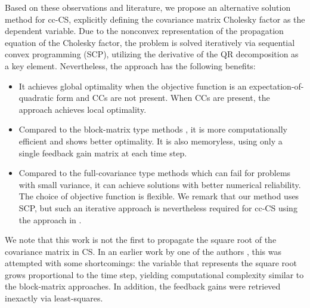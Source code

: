 Based on these observations and literature, we propose an alternative solution method for cc-CS, explicitly defining the covariance matrix Cholesky factor as the dependent variable. Due to the nonconvex representation of the propagation equation of the Cholesky factor, the problem is solved iteratively via sequential convex programming (SCP), utilizing the derivative of the QR decomposition as a key element. Nevertheless, the approach has the following benefits:
\begin{itemize}
	\item It achieves global optimality when the objective function is an expectation-of-quadratic form and CCs are not present. When CCs are present, the approach achieves local optimality.
	\item Compared to the block-matrix type methods \cite{okamotoOptimalCovarianceControl2018,okamotoOptimalStochasticVehicle2019}, it is more computationally efficient and shows better optimality. It is also memoryless, using only a single feedback gain matrix at each time step.
	\item Compared to the full-covariance type methods \cite{liuOptimalCovarianceSteering2025,pilipovskyComputationallyEfficientChance2024} which can fail for problems with small variance, it can achieve solutions with better numerical reliability. The choice of objective function is flexible. We remark that our method uses SCP, but such an iterative approach is nevertheless required for cc-CS using the approach in \cite{liuOptimalCovarianceSteering2025}.
\end{itemize}


We note that this work is not the first to propagate the square root of the covariance matrix in CS. In an earlier work by one of the authors \cite{oguriStochasticSequentialConvex2022}, this was attempted with some shortcomings: the variable that represents the square root grows proportional to the time step, yielding computational complexity similar to the block-matrix approaches. In addition, the feedback gains were retrieved inexactly via least-squares.